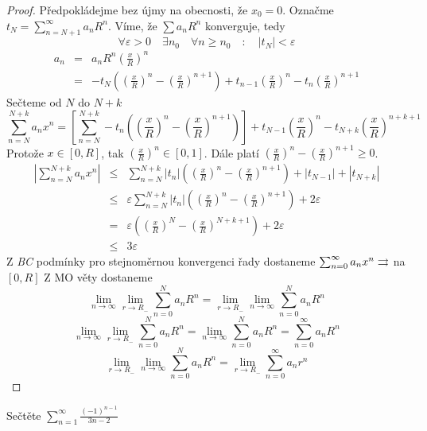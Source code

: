 \begin{proof}
Předpokládejme bez újmy na obecnosti, že $x_0 = 0$. Označme $t_N = \sum_{n=N+1}^{\infty} a_n R^n$. Víme, že $\sum a_n R^n$ konverguje, tedy
$$\forall \varepsilon>0 \quad \exists n_0 \quad \forall n \geq n_0 \quad : \quad |t_N| < \varepsilon$$
\begin{eqnarray*}
a_n & = & a_n R^n \left( \frac{x}{R} \right)^n \\
& = & - t_N \left( \left( \frac{x}{R} \right)^n - \left( \frac{x}{R} \right)^{n+1} \right) + t_{n-1} \left( \frac{x}{R} \right)^n - t_n \left( \frac{x}{R} \right)^{n+1} 
\end{eqnarray*}
Sečteme od $N$ do $N+k$
$$\sum_{n=N}^{N+k} a_n x^n = \left[ \sum_{n=N}^{N+k} -t_n \left( \left( \frac{x}{R} \right)^n - \left( \frac{x}{R} \right)^{n+1} \right) \right] + t_{N-1} \left( \frac{x}{R} \right)^n - t_{N+k} \left( \frac{x}{R} \right)^{n+k+1}$$
Protože $x \in [0, R]$, tak $\left( \frac{x}{R} \right)^n \in [0,1]$. Dále platí $\left( \frac{x}{R} \right)^{n} - \left( \frac{x}{R} \right)^{n+1} \geq 0$.
\begin{eqnarray*}
\left|\sum_{n=N}^{N+k} a_n x^n \right| & \leq & \sum_{n=N}^{N+k} |t_n| \left( \left( \frac{x}{R} \right)^{n} - \left( \frac{x}{R} \right)^{n+1} \right) + |t_{N-1}| + |t_{N+k}| \\
& \leq & \varepsilon \sum_{n=N}^{N+k} |t_n| \left( \left( \frac{x}{R} \right)^{n} - \left( \frac{x}{R} \right)^{n+1} \right) + 2 \varepsilon \\
& = & \varepsilon \left( \left( \frac{x}{R} \right)^{N} - \left( \frac{x}{R} \right)^{N+k+1} \right) + 2 \varepsilon \\
& \leq & 3 \varepsilon 
\end{eqnarray*}
Z \emph{BC} podmínky pro stejnoměrnou konvergenci řady dostaneme $\sum_{n=0}^{\infty} a_n x^n \rightrightarrows$ na $[0, R]$
Z MO věty dostaneme
$$\lim_{n \rightarrow \infty} \lim_{r \rightarrow R_-} \sum_{n=0}^{N} a_n R^n = \lim_{r \rightarrow R_-} \lim_{n \rightarrow \infty} \sum_{n=0}^{N} a_n R^n$$
$$\lim_{n \rightarrow \infty} \lim_{r \rightarrow R_-} \sum_{n=0}^{N} a_n R^n = \lim_{n \rightarrow \infty} \sum_{n=0}^{N} a_n R^n = \sum_{n=0}^{\infty} a_n R^n$$
$$\lim_{r \rightarrow R_-} \lim_{n \rightarrow \infty} \sum_{n=0}^{N} a_n R^n = \lim_{r \rightarrow R_-} \sum_{n=0}^{\infty} a_n r^n$$
\end{proof}

\begin{priklad}
Sečtěte $\sum_{n=1}^{\infty} \frac{(-1)^{n-1}}{3n-2}$
\end{priklad}

